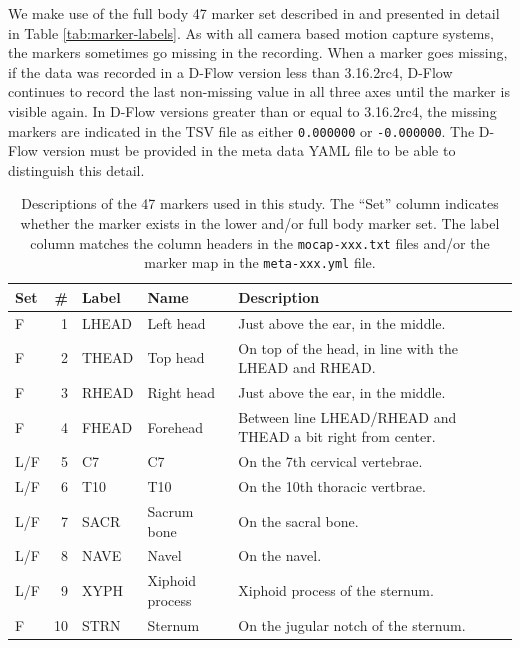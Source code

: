 \documentclass[fleqn,12pt]{wlpeerj}
\begin{document}
We make use of the full body 47 marker set described in \cite{Bogert2013} and
presented in detail in Table \ref{tab:marker-labels}. As with all camera based
motion capture systems, the markers sometimes go missing in the recording. When
a marker goes missing, if the data was recorded in a D-Flow version less than
3.16.2rc4, D-Flow continues to record the last non-missing value in all
three axes until the marker is visible again. In D-Flow versions greater than
or equal to 3.16.2rc4, the missing markers are indicated in the TSV file as
either \verb|0.000000| or \verb|-0.000000|. The D-Flow version must be provided
in the meta data YAML file to be able to distinguish this detail.
%
\begin{table}
  \cprotect\caption{Descriptions of the 47 markers used in this study. The
    ``Set'' column indicates whether the marker exists in the lower and/or full
    body marker set. The label column matches the column headers in the
    \verb|mocap-xxx.txt| files and/or the marker map in the \verb|meta-xxx.yml|
    file.}
  \centering
  \scriptsize
  \begin{tabular}{lrlll}
    \toprule
    Set & \# & Label & Name & Description \\
    \midrule
    F   & 1  & LHEAD & Left head                             & Just above the ear, in the middle. \\
    F   & 2  & THEAD & Top head                              & On top of the head, in line with the LHEAD and RHEAD. \\
    F   & 3  & RHEAD & Right head                            & Just above the ear, in the middle. \\
    F   & 4  & FHEAD & Forehead                              & Between line LHEAD/RHEAD and THEAD a bit right from center. \\
    L/F & 5  & C7    & C7                                    & On the 7th cervical vertebrae. \\
    L/F & 6  & T10   & T10                                   & On the 10th thoracic vertbrae. \\
    L/F & 7  & SACR  & Sacrum bone                           & On the sacral bone. \\
    L/F & 8  & NAVE  & Navel                                 & On the navel. \\
    L/F & 9  & XYPH  & Xiphoid process                       & Xiphoid process of the sternum. \\
    F   & 10 & STRN  & Sternum                               & On the jugular notch of the sternum. \\

\end{tabular}
\end{table}
\end{document}
